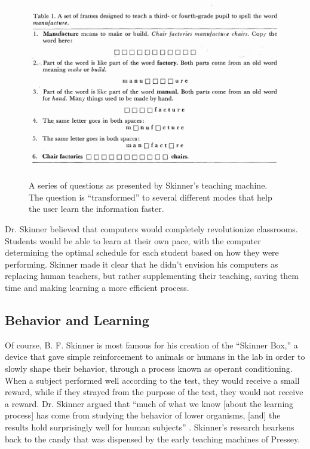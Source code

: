  \begin{figure}[h!]
 	\includegraphics[width=1.0\linewidth]{figures/skinner_machine}
 	\caption{A series of questions as presented by Skinner's teaching machine. The question is ``transformed'' to several different modes that help the user learn the information faster. }
 	\label{fig:skinner_machine}
 	\cite{benjamin1988history}
 \end{figure}
 

\par Dr. Skinner believed that computers would completely revolutionize classrooms. Students would be able to learn at their own pace, with the computer determining the optimal schedule for each student based on how they were performing. Skinner made it clear that he didn't envision his computers as replacing human teachers, but rather supplementing their teaching, saving them time and making learning a more efficient process.

\subsection{Behavior and Learning}

Of course, B. F. Skinner is most famous for his creation of the ``Skinner Box,'' \cite{skinner1963operant} a device that gave simple reinforcement to animals or humans in the lab in order to slowly shape their behavior, through a process known as operant conditioning. When a subject performed well according to the test, they would receive a small reward, while if they strayed from the purpose of the test, they would not receive a reward. Dr. Skinner argued that ``much of what we know [about the learning process] has come from studying the behavior of lower organisms, [and] the results hold surprisingly well for human subjects'' \cite{skinner1958teaching}. Skinner's research hearkens back to the candy that was dispensed by the early teaching machines of Pressey.

